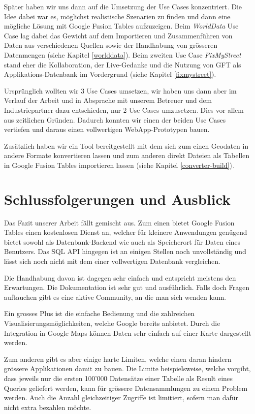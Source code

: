 Später haben wir uns dann auf die Umsetzung der Use Cases konzentriert. Die Idee dabei war es, möglichst realistische Szenarien zu finden und dann eine mögliche Lösung mit Google Fusion Tables aufzuzeigen. Beim \emph{WorldData} Use Case lag dabei das Gewicht auf dem Importieren und Zusammenführen von Daten aus verschiedenen Quellen sowie der Handhabung von grösseren Datenmengen (siehe Kapitel \ref{worlddata}). Beim zweiten Use Case \emph{FixMyStreet} stand eher die Kollaboration, der Live-Gedanke und die Nutzung von GFT als Applikations-Datenbank im Vordergrund (siehe Kapitel \ref{fixmystreet}).

Ursprünglich wollten wir 3 Use Cases umsetzen, wir haben uns dann aber im Verlauf der Arbeit und in Absprache mit unserem Betreuer und dem Industriepartner dazu entschieden, nur 2 Use Cases umzusetzen. Dies vor allem aus zeitlichen Gründen. Dadurch konnten wir einen der beiden Use Cases vertiefen und daraus einen vollwertigen WebApp-Prototypen bauen.

Zusätzlich haben wir ein Tool bereitgestellt mit dem sich zum einen Geodaten in andere Formate konvertieren lassen und zum anderen direkt Dateien als Tabellen in Google Fusion Tables importieren lassen (siehe Kapitel \ref{converter-build}).

\section{Schlussfolgerungen und Ausblick}
Das Fazit unserer Arbeit fällt gemischt aus. Zum einen bietet Google Fusion Tables einen kostenlosen Dienst an, welcher für kleinere Anwendungen genügend bietet sowohl als Datenbank-Backend wie auch als Speicherort für Daten eines Benutzers. Das SQL API hingegen ist an einigen Stellen noch unvollständig und lässt sich noch nicht mit dem einer vollwertigen Datenbank vergleichen.

Die Handhabung davon ist dagegen sehr einfach und entspricht meistens den Erwartungen. Die Dokumentation ist sehr gut und ausführlich. Falls doch Fragen auftauchen gibt es eine aktive Community, an die man sich wenden kann. 

Ein grosses Plus ist die einfache Bedienung und die zahlreichen Visualisierungsmöglichkeiten, welche Google bereits anbietet. Durch die Integration in Google Maps können Daten sehr einfach auf einer Karte dargestellt werden.

Zum anderen gibt es aber einige harte Limiten, welche einen daran hindern grössere Applikationen damit zu bauen. Die Limite beispielsweise, welche vorgibt, dass jeweils nur die ersten 100'000 Datensätze einer Tabelle als Result eines Queries geliefert werden, kann für grössere Datensammlungen zu einem Problem werden. Auch die Anzahl gleichzeitiger Zugriffe ist limitiert, sofern man dafür nicht extra bezahlen möchte.

